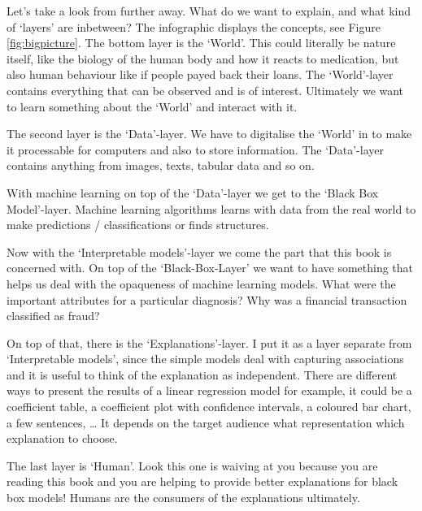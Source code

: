 \documentclass[12pt,]{krantz}
\theoremstyle{definition}
\theoremstyle{definition}
\theoremstyle{definition}
\theoremstyle{remark}
\begin{document}
Let's take a look from further away. What do we want to explain, and
what kind of `layers' are inbetween? The infographic displays the
concepts, see Figure \ref{fig:bigpicture}. The bottom layer is the
`World'. This could literally be nature itself, like the biology of the
human body and how it reacts to medication, but also human behaviour
like if people payed back their loans. The `World'-layer contains
everything that can be observed and is of interest. Ultimately we want
to learn something about the `World' and interact with it.

The second layer is the `Data'-layer. We have to digitalise the `World'
in to make it processable for computers and also to store information.
The `Data'-layer contains anything from images, texts, tabular data and
so on.

With machine learning on top of the `Data'-layer we get to the `Black
Box Model'-layer. Machine learning algorithms learns with data from the
real world to make predictions / classifications or finds structures.

Now with the `Interpretable models'-layer we come the part that this
book is concerned with. On top of the `Black-Box-Layer' we want to have
something that helps us deal with the opaqueness of machine learning
models. What were the important attributes for a particular diagnosis?
Why was a financial transaction classified as fraud?

On top of that, there is the `Explanations'-layer. I put it as a layer
separate from `Interpretable models', since the simple models deal with
capturing associations and it is useful to think of the explanation as
independent. There are different ways to present the results of a linear
regression model for example, it could be a coefficient table, a
coefficient plot with confidence intervals, a coloured bar chart, a few
sentences, \ldots{} It depends on the target audience what
representation which explanation to choose.

The last layer is `Human'. Look this one is waiving at you because you
are reading this book and you are helping to provide better explanations
for black box models! Humans are the consumers of the explanations
ultimately.
\end{document}
